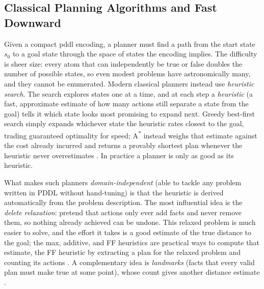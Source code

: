 \subsection{Classical Planning Algorithms and Fast Downward}
\label{subsec:planning-algorithms}
Given a compact \ac{pddl} encoding, a planner must find a path from the start state $s_0$ to a goal state through the space of states the encoding implies. The difficulty is sheer size: every atom that can independently be true or false doubles the number of possible states, so even modest problems have astronomically many, and they cannot be enumerated. Modern classical planners instead use \emph{heuristic search}. The search explores states one at a time, and at each step a \emph{heuristic} (a fast, approximate estimate of how many actions still separate a state from the goal) tells it which state looks most promising to expand next. Greedy best-first search simply expands whichever state the heuristic rates closest to the goal, trading guaranteed optimality for speed; A\textsuperscript{*} \cite{hart1968formal} instead weighs that estimate against the cost already incurred and returns a provably shortest plan whenever the heuristic never overestimates \cite{geffner2013concise}. In practice a planner is only as good as its heuristic.

What makes such planners \emph{domain-independent} (able to tackle any problem written in PDDL without hand-tuning) is that the heuristic is derived automatically from the problem description. The most influential idea is the \emph{delete relaxation}: pretend that actions only ever add facts and never remove them, so nothing already achieved can be undone. This relaxed problem is much easier to solve, and the effort it takes is a good estimate of the true distance to the goal; the max, additive, and FF heuristics are practical ways to compute that estimate, the FF heuristic by extracting a plan for the relaxed problem and counting its actions \cite{hoffmann2001ff, geffner2013concise}. A complementary idea is \emph{landmarks} (facts that every valid plan must make true at some point), whose count gives another distance estimate \cite{richter2010lama}.

